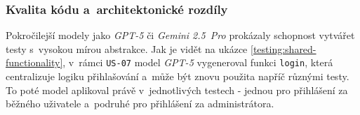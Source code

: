 \documentclass[czech, ing, kiv, he, iso690numb, viewonly]{fasthesis}
\begin{document}
\begin{table}[H]
    \centering
    \footnotesize
    \setlength{\tabcolsep}{3pt}
    \caption{\protect\centering Výsledky hodnocení kvality generování testů pro pozitivní scénáře (škála 0-3, viz \ref{subsection:metodika-exekuce}).}
    \label{tab:happy-path-results}
\end{table}

\subsubsection*{Kvalita kódu a~architektonické rozdíly}
Pokročilejší modely jako \textit{GPT-5} či \textit{Gemini 2.5~Pro} prokázaly 
schopnost vytvářet testy s~vysokou mírou abstrakce. Jak je vidět na ukázce \ref{testing:shared-functionality},
v~rámci \texttt{US-07} model \textit{GPT-5} vygeneroval funkci \texttt{login}, 
která centralizuje logiku přihlašování a~může být znovu použita napříč různými testy.
To poté model aplikoval právě v~jednotlivých testech - jednou pro přihlášení za běžného uživatele a~podruhé 
pro přihlášení za administrátora.
\end{document}
